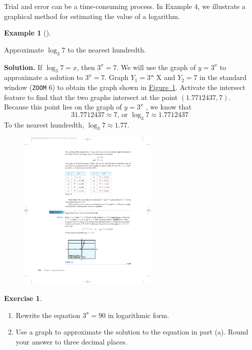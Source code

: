 \documentclass[10pt,]{book}
\theoremstyle{plain}
\theoremstyle{definition}
\theoremstyle{definition}
\theoremstyle{definition}
\newtheorem{example}[theorem]{Example}
\theoremstyle{definition}
\theoremstyle{definition}
\newtheorem{exercise}[theorem]{Exercise}
\numberwithin{equation}{section}
\begin{document}
	Trial and error can be a time-consuming process. In Example 4, we illustrate a graphical method for estimating the value of a logarithm.
%
\begin{example}[]\label{example-approximate-log}

	Approximate \(\log_{3}{7}\) to the nearest hundredth.
%
\par\medskip\noindent%
\textbf{Solution.}\quad 
	If \(\log_{3}{7}=x\), then \(3^x = 7\). We will use the graph of \(y = 3^x\) to approximate a solution to \(3^x = 7\). Graph \(Y_1 =3\)\lstinline?^? X and \(Y_2 = 7\) in the standard window (\lstinline?ZOOM? 6) to obtain the graph shown in \hyperref[fig-GC-approx-log]{Figure~\ref{fig-GC-approx-log}}. Activate the intersect feature to find that the two graphs intersect at the point \((1.7712437, 7)\). Because this point lies on the graph of \(y = 3^x\) , we know that
	\begin{equation*}31.7712437 \approx 7\text{, or } \log_{3}{7} \approx 1.7712437\end{equation*}
	To the nearest hundredth, \(\log_{3}{7} \approx 1.77\).
%
\leavevmode%
\begin{figure}
\centering
\includegraphics[width=0.60\textwidth,]{images/fig-GC-approx-log.pdf}\caption{\label{fig-GC-approx-log}}
\end{figure}
\end{example}
\begin{exercise}\label{exercise-approximate-log}
\leavevmode%
\begin{enumerate}[label=*\alph**]
\item\hypertarget{li-708}{}Rewrite the equation \(3^x = 90\) in logarithmic form.\item\hypertarget{li-709}{}Use a graph to approximate the solution to the equation in part (a). Round your answer to three decimal places.\end{enumerate}
\end{exercise}
\typeout{************************************************}
\typeout{************************************************}
\end{document}
